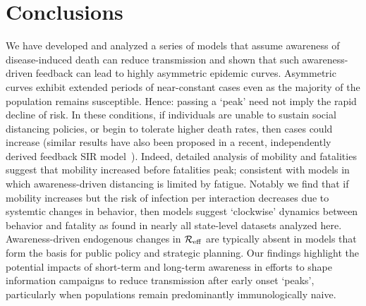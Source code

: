 \section{Conclusions}
We have developed and analyzed
a series of models that assume awareness of disease-induced death can 
reduce transmission and shown that such awareness-driven feedback
can lead
to highly asymmetric epidemic curves.  Asymmetric
curves exhibit extended periods of near-constant
cases even as the majority of the population remains susceptible.
Hence: passing a `peak' need not imply
the rapid decline of risk.  
In these conditions, if individuals are unable
to sustain social
distancing policies, or begin to tolerate higher death rates, then cases 
could increase (similar results have also been proposed in a recent, independently derived feedback SIR model~\citep{franco2020feedback}). 
Indeed, detailed analysis of mobility and fatalities suggest
that mobility increased before fatalities peak; consistent
with models in which awareness-driven distancing
is limited by fatigue.  Notably we find that
if mobility increases but the risk of infection per interaction
decreases due to systemtic changes in behavior, then models
suggest `clockwise' dynamics between behavior and fatality 
as found in nearly all state-level datasets analyzed here.
Awareness-driven
endogenous changes in ${\cal{R}}_{\mathrm{eff}}$ are typically
absent in models that form the basis for public policy and strategic planning.
Our findings
highlight the potential impacts of short-term and long-term awareness 
in efforts to shape information campaigns
to reduce transmission after early onset `peaks', particularly
when populations remain predominantly immunologically naive.

